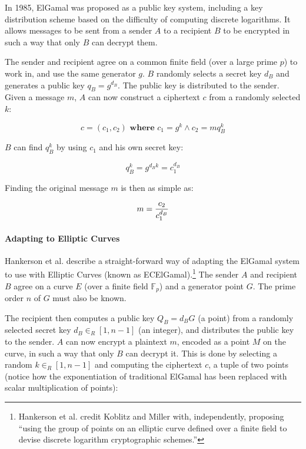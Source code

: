 \label{sec:math_encryption_elgamal}

In 1985, ElGamal was proposed as a public key system, including a key distribution scheme based
on the difficulty of computing discrete logarithms. It allows messages to be sent from a sender
\(A\) to a recipient \(B\) to be encrypted in such a way that only \(B\) can decrypt them.

The sender and recipient agree on a common finite field (over a large prime \(p\)) to work in,
and use the same generator \(g\). \(B\) randomly selects a secret key \(d_B\) and generates a
public key \(q_B = g^{d_B}\). The public key is distributed to the sender. Given a message \(m\),
\(A\) can now construct a ciphertext \(c\) from a randomly selected \(k\):\cite{elgamal}

\begin{equation}
	c = (c_1, c_2)  \textbf{ where }  c_1 = g^k \land c_2 = m q_B^k
\end{equation}

\(B\) can find \(q_B^k\) by using \(c_1\) and his own secret key:

\begin{equation}
	q_B^k = g^{d_B k} = c_1^{d_B}
\end{equation}

Finding the original message \(m\) is then as simple as:

\begin{equation}
    m = {c_2 \over c_1^{d_B}}
\end{equation}

\paragraph{Adapting to Elliptic Curves}
Hankerson et al. describe a straight-forward way of adapting the ElGamal system to use with
Elliptic Curves (known as ECElGamal).\footnote{Hankerson et al. credit Koblitz and Miller with, independently, proposing
``using the group of points on an elliptic curve defined over a finite field to devise discrete
logarithm cryptographic schemes.''\cite{hankerson2010}} The sender \(A\) and recipient \(B\) agree on a curve \(E\)
(over a finite field \(\mathbb{F}_p\)) and a generator point \(G\). The prime order \(n\) of \(G\) must also be
known.

The recipient then computes a public key \(Q_B = d_B G\) (a point) from a randomly selected secret key
\(d_B \in_R [1,n-1]\) (an integer), and distributes the public key to the sender. \(A\) can now encrypt
a plaintext \(m\), encoded as a point \(M\) on the curve, in such a way that only \(B\) can decrypt
it. This is done by selecting a random \(k \in_R [1,n-1]\) and computing the ciphertext \(c\), a
tuple of two points (notice how the exponentiation of traditional ElGamal has been replaced with scalar
multiplication of points):


